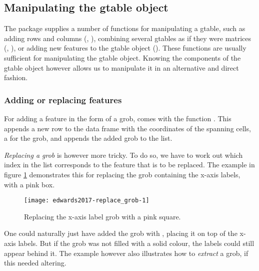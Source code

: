 \subsection{Manipulating the gtable object}

The  package supplies a number of functions for manipulating
a gtable, such as adding rows and columns (,
), combining several gtables as if 
they were matrices (, ),
or adding new features to the gtable object ().
These functions are usually sufficient for manipulating the gtable object.
Knowing the components of the gtable object however allows us to manipulate 
it in an alternative and direct fashion.

\subsubsection{Adding or replacing features}

For adding a feature in the form of a grob,  comes with the function 
.
This appends a new row to the  data frame with the coordinates of the
spanning cells, a  for the grob, 
and appends the added grob to the  list.

\emph{Replacing a grob} is however more tricky. 
To do so, we have to work out which index in the  list corresponds 
to the feature that is to be replaced. 
The example in figure \ref{fig:replace_grob} demonstrates this for replacing the grob containing the 
x-axis labels, with  a pink box.

\begin{figure}[h!]


\texttt{[image: edwards2017-replace\_grob-1]} 

\caption{Replacing the x-axis label grob with a pink square.}
  \label{fig:replace_grob}

\end{figure}

One could naturally just have added the grob with
, placing it on top of the x-axis labels. But if
the grob was not filled with a solid colour, the labels could still
appear behind it. The example however also illustrates how to
\emph{extract} a grob, if this needed altering.

